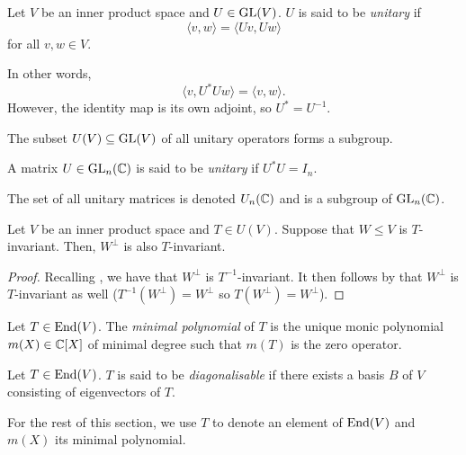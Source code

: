 		\begin{fdef}
			Let $V$ be an inner product space and $U \in \operatorname{GL}(V)$. $U$ is said to be \emph{unitary} if
			\[ \langle v,w\rangle = \langle Uv, Uw \rangle \]
			for all $v,w\in V$.
		\end{fdef}

		In other words,
		\[ \langle v, U^*Uw\rangle = \langle v, w\rangle. \]
		However, the identity map is its own adjoint, so $U^* = U^{-1}$.

		The subset $U(V) \subseteq \operatorname{GL}(V)$ of all unitary operators forms a subgroup.

		\begin{fdef}
			A matrix $U \in \operatorname{GL}_n(\mathbb{C})$ is said to be \emph{unitary} if $U^*U = I_n$.
		\end{fdef}

		The set of all unitary matrices is denoted $U_n(\mathbb{C})$ and is a subgroup of $\operatorname{GL}_n(\mathbb{C})$.

		\begin{fprop}
			\label{prop: unitary perp is invariant}
			Let $V$ be an inner product space and $T \in U(V)$. Suppose that $W \le V$ is $T$-invariant. Then, $W^\perp$ is also $T$-invariant.
		\end{fprop}
		\begin{proof}
			Recalling , we have that $W^\perp$ is $T^{-1}$-invariant. It then follows by  that $W^\perp$ is $T$-invariant as well ($T^{-1}(W^\perp) = W^\perp$ so $T(W^\perp) = W^\perp$).
		\end{proof}

		\begin{fdef}
			\label{minimal polynomial}
			Let $T \in \operatorname{End}(V)$. The \emph{minimal polynomial} of $T$ is the unique monic polynomial $m(X) \in \mathbb{C}[X]$ of minimal degree such that $m(T)$ is the zero operator.
		\end{fdef}

		\begin{fdef}[Diagonalisable]
			Let $T \in \operatorname{End}(V)$. $T$ is said to be \emph{diagonalisable} if there exists a basis $B$ of $V$ consisting of eigenvectors of $T$.
		\end{fdef}

		For the rest of this section, we use $T$ to denote an element of $\operatorname{End}(V)$ and $m(X)$ its minimal polynomial.

